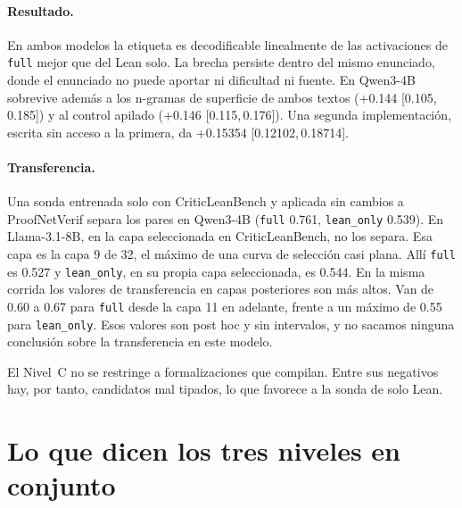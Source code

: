\documentclass[10pt]{article}
\newcommand{\vr}[1]{\texttt{#1}}
\newcommand{\ic}[2]{[#1,\,#2]}
\begin{document}
\paragraph{Resultado.}
En ambos modelos la etiqueta es decodificable linealmente de las activaciones de \vr{full} mejor que del Lean solo.
La brecha persiste dentro del mismo enunciado, donde el enunciado no puede aportar ni dificultad ni fuente. En
Qwen3-4B sobrevive además a los n-gramas de superficie de ambos textos (+0.144 \ic{0.105}{0.185}) y al control
apilado (+0.146 \ic{0.115}{0.176}). Una segunda implementación, escrita sin acceso a la primera, da +0.15354
\ic{0.12102}{0.18714}.

\paragraph{Transferencia.}
Una sonda entrenada solo con CriticLeanBench y aplicada sin cambios a ProofNetVerif separa los pares en Qwen3-4B
(\vr{full} 0.761, \vr{lean\_only} 0.539). En Llama-3.1-8B, en la capa seleccionada en CriticLeanBench, no los separa.
Esa capa es la capa 9 de 32, el máximo de una curva de selección casi plana. Allí \vr{full} es 0.527 y
\vr{lean\_only}, en su propia capa seleccionada, es 0.544. En la misma corrida los valores de transferencia en capas
posteriores son más altos. Van de 0.60 a 0.67 para \vr{full} desde la capa 11 en adelante, frente a un máximo de
0.55 para \vr{lean\_only}. Esos valores son post hoc y sin intervalos, y no sacamos ninguna conclusión sobre la
transferencia en este modelo.

El Nivel~C no se restringe a formalizaciones que compilan. Entre sus negativos hay, por tanto, candidatos mal
tipados, lo que favorece a la sonda de solo Lean.

\section{Lo que dicen los tres niveles en conjunto}
\end{document}
